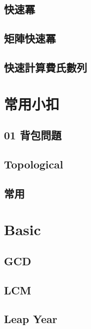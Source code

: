     \subsection{快速冪}
        
    \subsection{矩陣快速冪}
        
    \subsection{快速計算費氏數列}
        


\section{常用小扣}
    \subsection{01 背包問題}
        
    \subsection{Topological}
        
    \subsection{常用}
        


\section{Basic}
    \subsection{GCD}
        
    \subsection{LCM}
        
    \subsection{Leap Year}
        


